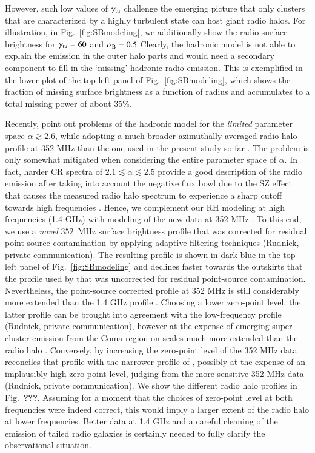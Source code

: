 \documentclass[useAMS,usenatbib]{mn2e}
\begin{document}
However, such low values of $\gamma_{{\mathrm{tu}}}$ challenge the emerging picture
that only clusters that are characterized by a highly turbulent state can host
giant radio halos. For illustration, in Fig.~\ref{fig:SBmodeling}, we
additionally show the radio surface brightness for $\gamma_{{\mathrm{tu}}} = 60$ and
$\alpha_{{\mathrm{B}}}=0.5$ Clearly, the hadronic model is not able to explain the
emission in the outer halo parts and would need a secondary component to fill in
the `missing' hadronic radio emission.  This is exemplified in the lower plot of
the top left panel of Fig.~\ref{fig:SBmodeling}, which shows the fraction of
missing surface brightness as a function of radius and accumulates to a total
missing power of about 35\%.

Recently, \citet{2012arXiv1207.3025B} point out problems of the hadronic model
for the {\em limited} parameter space $\alpha\gtrsim2.6$, while adopting a much
broader azimuthally averaged radio halo profile at 352 MHz
\citep{2011MNRAS.412....2B} than the one used in the present study so far
\citep{1997A&A...321...55D}. The problem is only somewhat mitigated when
considering the entire parameter space of $\alpha$. In fact, harder CR spectra
of $2.1\lesssim \alpha\lesssim2.5$ provide a good description of the radio
emission after taking into account the negative flux bowl due to the SZ effect
that causes the measured radio halo spectrum to experience a sharp cutoff
towards high frequencies \citep{2004A&A...413...17P}. Hence, we complement our
RH modeling at high frequencies (1.4 GHz) with modeling of the new data at 352
MHz \citep{2011MNRAS.412....2B}. To this end, we use a {\em novel} $352$~MHz
surface brightness profile that was corrected for residual point-source
contamination by applying adaptive filtering techniques (Rudnick, private
communication). The resulting profile is shown in dark blue in the top left
panel of Fig.~\ref{fig:SBmodeling} and declines faster towards the outskirts
that the profile used by \citet{2012arXiv1207.3025B} that was uncorrected for
residual point-source contamination. Nevertheless, the point-source corrected
profile at 352 MHz \citep{2011MNRAS.412....2B} is still considerably more
extended than the 1.4 GHz profile \citep{1997A&A...321...55D}. Choosing a lower
zero-point level, the latter profile can be brought into agreement with the
low-frequency profile (Rudnick, private communication), however at the expense
of emerging super cluster emission from the Coma region on scales much more
extended than the radio halo \citep{2007ApJ...659..267K}. Conversely, by
increasing the zero-point level of the 352 MHz data \citep{2011MNRAS.412....2B}
reconciles that profile with the narrower profile of
\citet{1997A&A...321...55D}, possibly at the expense of an implausibly high
zero-point level, judging from the more sensitive 352 MHz data (Rudnick, private
communication). We show the different radio halo profiles in Fig.~{\bf ???}.  Assuming
for a moment that the choices of zero-point level at both frequencies were
indeed correct, this would imply a larger extent of the radio halo at lower
frequencies.  Better data at 1.4 GHz and a careful cleaning of the emission of
tailed radio galaxies is certainly needed to fully clarify the observational
situation.
\end{document}
